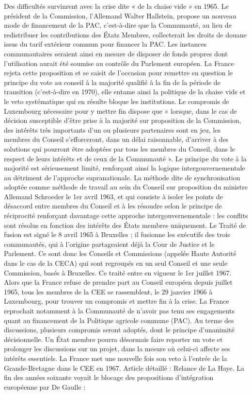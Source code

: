 \documentclass{report}%
\begin{document}
Des difficultés survinrent avec la crise dite « de la chaise vide » en 1965. Le président de la Commission, l'Allemand Walter Hallstein, propose un nouveau mode de financement de la PAC, c’est-à-dire que la Communauté, au lieu de redistribuer les contributions des États Membres, collecterait les droits de douane issus du tarif extérieur commun pour financer la PAC. Les instances communautaires seraient ainsi en mesure de disposer de fonds propres dont l'utilisation aurait été soumise au contrôle du Parlement européen. La France rejeta cette proposition et se saisit de l'occasion pour remettre en question le principe du vote au conseil à la majorité qualifié à la fin de la période de transition (c’est-à-dire en 1970), elle entame ainsi la politique de la chaise vide et le veto systématique qui en résulte bloque les institutions. Le compromis de Luxembourg nécessaire pour y mettre fin dispose que « lorsque, dans le cas de décision susceptible d'être prise à la majorité sur proposition de la Commission, des intérêts très importants d'un ou plusieurs partenaires sont en jeu, les membres du Conseil s'efforceront, dans un délai raisonnable, d'arriver à des solutions qui pourront être adoptées par tous les membres du Conseil, dans le respect de leurs intérêts et de ceux de la Communauté ».
Le principe du vote à la majorité est sérieusement limité, renforçant ainsi la logique intergouvernementale au détriment de l'approche supranationale. La méthode dite de synchronisation adoptée comme méthode de travail au sein du Conseil sur proposition du ministre Allemand Schroeder le 1er avril 1963, et qui consiste à isoler les points de désaccord entre membres du Conseil et à les résoudre selon le principe de réciprocité renforçant davantage cette approche intergouvernementale : les conflits sont résolus en fonction des intérêts des États membres uniquement.
Le Traité de fusion est signé le 8 avril 1965 à Bruxelles ; il fusionne les exécutifs des trois communautés, qui à l'origine partageaient déjà la Cour de Justice et le Parlement. Ce sont donc les Conseils et Commissions (appelée Haute Autorité dans le cas de la CECA) qui sont regroupés en un seul Conseil et une seule Commission, basés à Bruxelles. Ce traité entre en vigueur le 1er juillet 1967.
Alors que la France refuse de prendre part au Conseil européen depuis juillet 1965, tous les membres de la CEE se rassemblent, le 29 janvier 1966 à Luxembourg, pour trouver un compromis et mettre fin à la crise. La France reprochait notamment à la Communauté de n’avoir pas tenu ses engagements quant au financement de la Politique agricole commune (PAC). Au terme des discussions, plusieurs compromis seront adoptés, dont le principe d’unanimité décisionnelle. Un État membre pourra désormais faire reporter un vote et prolonger les discussions sur un projet, dans la mesure où celui-ci affecte ses intérêts essentiels.
La France met une nouvelle fois son veto à l’entrée de la Grande-Bretagne dans le CEE en 1967.
Article détaillé : Relance de La Haye.
La fin des années soixante voyait le blocage des propositions d’intégration européenne par De Gaulle :
\end{document}
